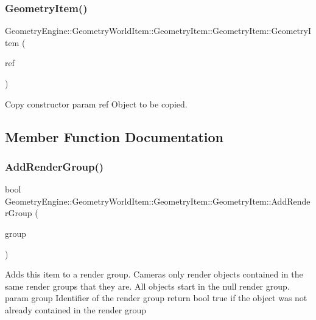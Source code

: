 \subsubsection{\texorpdfstring{GeometryItem()}{GeometryItem()}\hspace{0.1cm}{\footnotesize\ttfamily [2/2]}}
{\footnotesize\ttfamily Geometry\+Engine\+::\+Geometry\+World\+Item\+::\+Geometry\+Item\+::\+Geometry\+Item\+::\+Geometry\+Item (\begin{DoxyParamCaption}\item[{const \mbox{\hyperlink{class_geometry_engine_1_1_geometry_world_item_1_1_geometry_item_1_1_geometry_item}{Geometry\+Item}} \&}]{ref }\end{DoxyParamCaption})}

Copy constructor param ref Object to be copied. 

\subsection{Member Function Documentation}
\mbox{\label{class_geometry_engine_1_1_geometry_world_item_1_1_geometry_item_1_1_geometry_item_adff9d0c0188f96abdbbec182ac1901d8}} 
\subsubsection{\texorpdfstring{AddRenderGroup()}{AddRenderGroup()}}
{\footnotesize\ttfamily bool Geometry\+Engine\+::\+Geometry\+World\+Item\+::\+Geometry\+Item\+::\+Geometry\+Item\+::\+Add\+Render\+Group (\begin{DoxyParamCaption}\item[{int}]{group }\end{DoxyParamCaption})\hspace{0.3cm}{\ttfamily [virtual]}}

Adds this item to a render group. Cameras only render objects contained in the same render groups that they are. All objects start in the null render group. param group Identifier of the render group return bool true if the object was not already contained in the render group \mbox{\label{class_geometry_engine_1_1_geometry_world_item_1_1_geometry_item_1_1_geometry_item_a4b9c066cbd4ab85ffae11bb4dcd9fc64}} 
